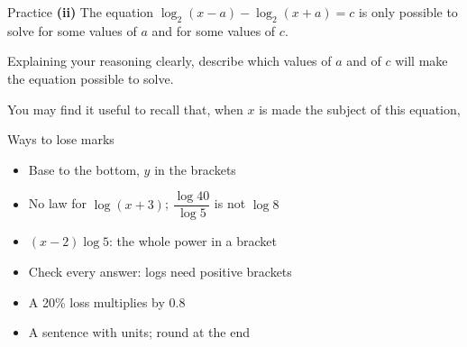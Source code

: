 \documentclass[aspectratio=169,11pt,xcolor=table,t]{beamer}
\newcommand\hp[1]{\fref{Handout p.\pageref{H-#1}}}
\begin{document}
\begin{frame}{Practice}
\relax
\textbf{(ii)} The equation $\log_{2}(x-a) - \log_{2}(x+a) = c$ is only possible to solve for some values of $a$ and for some values of $c$.\par\smallskip
Explaining your reasoning clearly, describe which values of $a$ and of $c$ will make the equation possible to solve.\par\smallskip
You may find it useful to recall that, when $x$ is made the subject of this equation,
\end{frame}

\begin{frame}{Ways to lose marks}
\relax
\begin{itemize}
\item \textbf{} Base to the bottom, $y$ in the brackets
\item \textbf{} No law for $\log(x+3)$; $\dfrac{\log 40}{\log 5}$ is not $\log 8$
\item \textbf{} $(x-2)\log 5$: the whole power in a bracket
\item \textbf{} Check every answer: logs need positive brackets
\item \textbf{} A 20\% loss multiplies by 0.8
\item \textbf{} A sentence with units; round at the end
\end{itemize}
\hp{h2:lose}
\end{frame}
\end{document}
